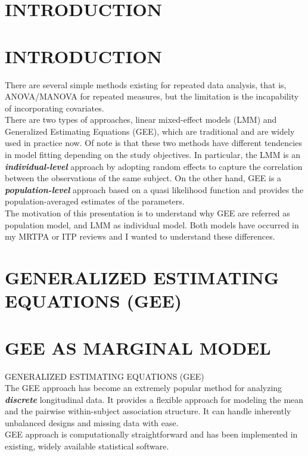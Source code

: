 \documentclass[letterpaper,11pt]{article}
\begin{document}
\section*{INTRODUCTION}

\section{INTRODUCTION}

There are several simple methods existing for repeated data analysis, that is, ANOVA/MANOVA for repeated measures,
but the limitation is the incapability of incorporating covariates.\\

There are two types of approaches, linear mixed-effect models (LMM) and Generalized Estimating Equations (GEE), which are traditional and are widely used in practice now. Of note is that these two methods have different tendencies in model fitting depending on the study objectives. In particular, the LMM is an \textbf{\textit{individual-level}} approach by adopting random effects to capture the correlation between the observations of the same subject. On the other hand, GEE is a \textbf{\textit{population-level}} approach based on a quasi likelihood function and provides the population-averaged estimates of the parameters.\\

The motivation of this presentation is to understand why GEE are referred as population model, and LMM as individual model.
Both models have occurred in my MRTPA or ITP reviews and I wanted to understand these differences.

\newpage
\noindent 

\section*{GENERALIZED ESTIMATING EQUATIONS (GEE)}

\section{GEE AS MARGINAL MODEL}

GENERALIZED ESTIMATING EQUATIONS (GEE)\\

The GEE approach has become an extremely popular method for analyzing \textbf{\textit{discrete}} longitudinal data.
It provides a flexible approach for modeling the mean and the pairwise within-subject association structure.
It can handle inherently unbalanced designs and missing data with ease.\\
GEE approach is computationally straightforward and has been implemented in existing, widely available statistical software.\\
\end{document}
